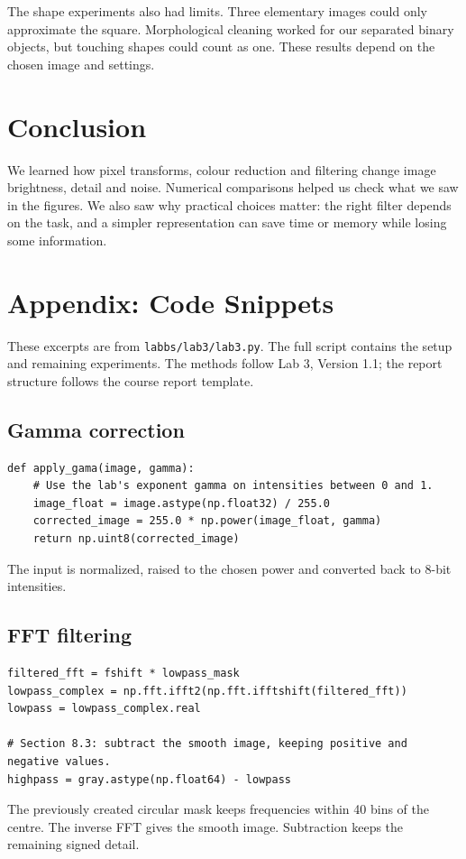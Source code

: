 \documentclass[11pt,a4paper]{article}
\begin{document}
The shape experiments also had limits. Three elementary images could only approximate the square. Morphological cleaning worked for our separated binary objects, but touching shapes could count as one. These results depend on the chosen image and settings.

\section{Conclusion}
We learned how pixel transforms, colour reduction and filtering change image brightness, detail and noise. Numerical comparisons helped us check what we saw in the figures. We also saw why practical choices matter: the right filter depends on the task, and a simpler representation can save time or memory while losing some information.

\clearpage
\section*{Appendix: Code Snippets}
These excerpts are from \texttt{labbs/lab3/lab3.py}. The full script contains the setup and remaining experiments. The methods follow Lab 3, Version 1.1; the report structure follows the course report template.

\subsection*{Gamma correction}
\begin{samepage}
\begin{small}
\begin{verbatim}
def apply_gama(image, gamma):
    # Use the lab's exponent gamma on intensities between 0 and 1.
    image_float = image.astype(np.float32) / 255.0
    corrected_image = 255.0 * np.power(image_float, gamma)
    return np.uint8(corrected_image)
\end{verbatim}
\end{small}
The input is normalized, raised to the chosen power and converted back to 8-bit intensities.
\end{samepage}

\subsection*{FFT filtering}
\begin{samepage}
\begin{small}
\begin{verbatim}
filtered_fft = fshift * lowpass_mask
lowpass_complex = np.fft.ifft2(np.fft.ifftshift(filtered_fft))
lowpass = lowpass_complex.real

# Section 8.3: subtract the smooth image, keeping positive and negative values.
highpass = gray.astype(np.float64) - lowpass
\end{verbatim}
\end{small}
The previously created circular mask keeps frequencies within 40 bins of the centre. The inverse FFT gives the smooth image. Subtraction keeps the remaining signed detail.
\end{samepage}
\end{document}
